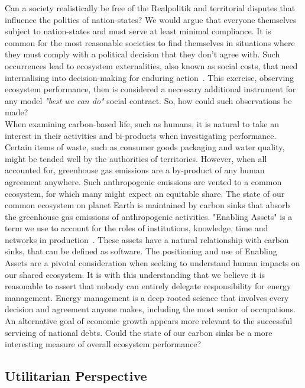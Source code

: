 \documentclass[11pt, oneside]{article}   	%
\begin{document}
Can a society realistically be free of the Realpolitik and territorial disputes that influence the politics of nation-states?
We would argue that everyone themselves subject to nation-states and must serve at least minimal compliance.
It is common for the most reasonable societies to find themselves in situations where they must comply with a political decision that they don't agree with.
Such occurrences lead to ecosystem externalities, also known as social costs, that need internalising into decision-making for enduring action~\cite{rc1}.
This exercise, observing ecosystem performance, then is considered a necessary additional instrument for any model \emph{"best we can do"} social contract.
So, how could such observations be made?\\

When examining carbon-based life, such as humans, it is natural to take an interest in their activities and bi-products when investigating performance.
Certain items of waste, such as consumer goods packaging and water quality, might be tended well by the authorities of territories.
However, when all accounted for, greenhouse gas emissions are a by-product of any human agreement anywhere.
Such anthropogenic emissions are vented to a common ecosystem, for which many might expect an equitable share.
The state of our common ecosystem on planet Earth is maintained by carbon sinks that absorb the greenhouse gas emissions of anthropogenic activities.
"Enabling Assets" is a term we use to account for the roles of institutions, knowledge, time and networks in production~\cite{pd3}.
These assets have a natural relationship with carbon sinks, that can be defined as software.
The positioning and use of Enabling Assets are a pivotal consideration when seeking to understand human impacts on our shared ecosystem.
It is with this understanding that we believe it is reasonable to assert that nobody can entirely delegate responsibility for energy management.
Energy management is a deep rooted science that involves every decision and agreement anyone makes, including the most senior of occupations.
An alternative goal of economic growth appears more relevant to the successful servicing of national debts.
Could the state of our carbon sinks be a more interesting measure of overall ecosystem performance?\\

\subsection{Utilitarian Perspective}
\end{document}

